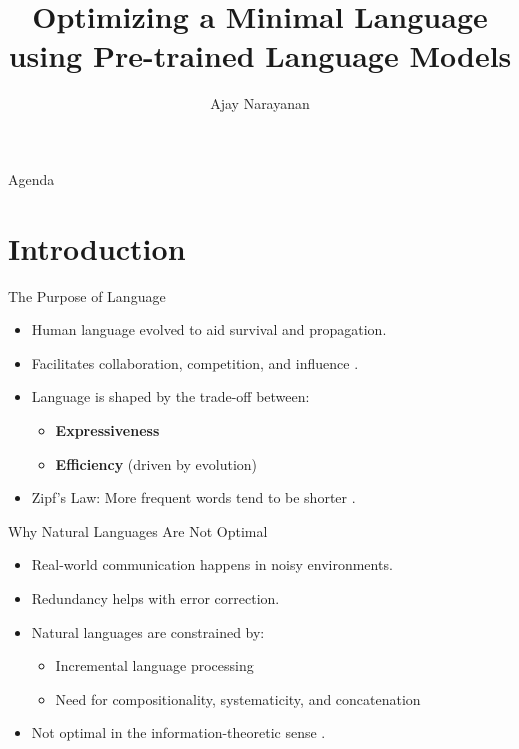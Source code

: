 \documentclass{beamer}
\title{Optimizing a Minimal Language using Pre-trained Language Models}
\date{}
\author{Ajay Narayanan}
\institute{Technical University of Munich}
\begin{document}
  \maketitle

\begin{frame}{Agenda}
	\tableofcontents
\end{frame}

\section{Introduction}

\begin{frame}{The Purpose of Language}
	\begin{itemize}
		\item Human language evolved to aid survival and propagation.
		\item Facilitates collaboration, competition, and influence \cite{Levshina_2022}.
		\item Language is shaped by the trade-off between:
		\begin{itemize}
			\item \textbf{Expressiveness}
			\item \textbf{Efficiency} (driven by evolution) \cite{haCostBenefit2010}
		\end{itemize}
		\item Zipf's Law: More frequent words tend to be shorter \cite{piantadosiZipfsWordFrequency2014}.
	\end{itemize}
\end{frame}

\begin{frame}{Why Natural Languages Are Not Optimal}
	\begin{itemize}
		\item Real-world communication happens in noisy environments.
		\item Redundancy helps with error correction.
		\item Natural languages are constrained by:
		\begin{itemize}
			\item Incremental language processing
			\item Need for compositionality, systematicity, and concatenation
		\end{itemize}
		\item Not optimal in the information-theoretic sense \cite{futrellInformationTheoryBridge2022}.
	\end{itemize}
\end{frame}
\end{document}
